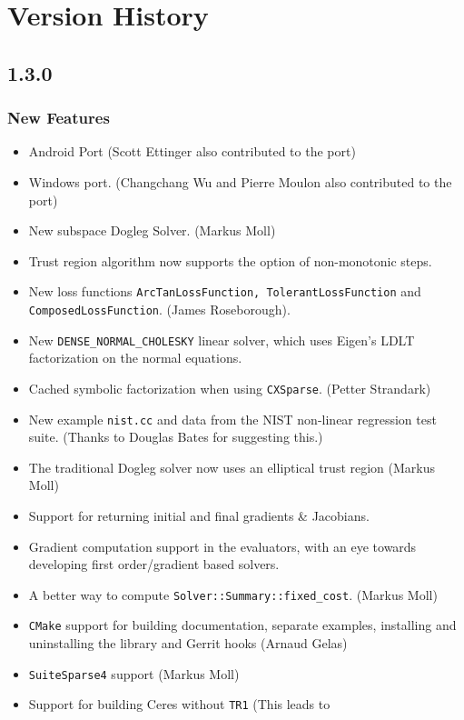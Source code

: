 
\chapter{Version History}
\section*{1.3.0}
\subsection{New Features}
\begin{itemize}
\item Android Port (Scott Ettinger also contributed to the port)
\item Windows port. (Changchang Wu and Pierre Moulon also contributed to the port)
\item New subspace Dogleg Solver. (Markus Moll)
\item Trust region algorithm now supports the option of non-monotonic steps.
\item New loss functions \texttt{ArcTanLossFunction,
    TolerantLossFunction} and \texttt{ComposedLossFunction}. (James Roseborough).
\item New \texttt{DENSE\_NORMAL\_CHOLESKY} linear solver, which uses Eigen's
  LDLT factorization on the normal equations.
\item Cached symbolic factorization when using \texttt{CXSparse}.
  (Petter Strandark)
\item New example \texttt{nist.cc} and data from the NIST non-linear
  regression test suite. (Thanks to Douglas Bates for suggesting this.)
\item The traditional Dogleg solver now uses an elliptical trust
  region (Markus Moll)
\item Support for returning initial and final gradients \& Jacobians.
\item Gradient computation support in the evaluators, with an eye
  towards developing first order/gradient based solvers.
\item A better way to compute \texttt{Solver::Summary::fixed\_cost}. (Markus Moll)
\item \texttt{CMake} support for building documentation, separate examples,
  installing and uninstalling the library and Gerrit hooks (Arnaud
  Gelas)
\item \texttt{SuiteSparse4} support (Markus Moll)
\item Support for building Ceres without \texttt{TR1} (This leads to

\end{itemize}
